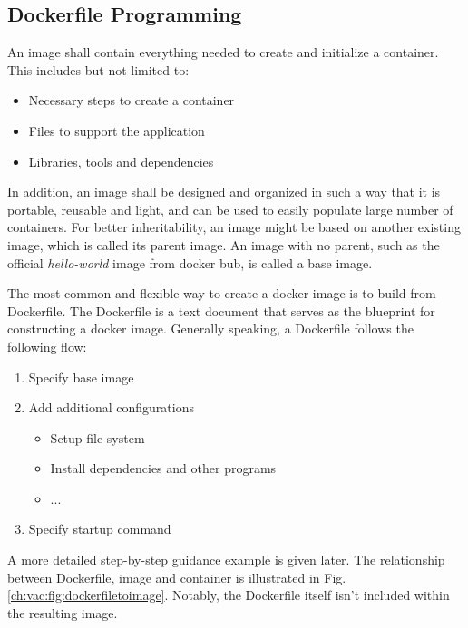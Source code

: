 \subsection{Dockerfile Programming}

An image shall contain everything needed to create and initialize a container. This includes but not limited to:
\begin{itemize}
  \item Necessary steps to create a container
  \item Files to support the application
  \item Libraries, tools and dependencies
\end{itemize}
In addition, an image shall be designed and organized in such a way that it is portable, reusable and light, and can be used to easily populate large number of containers. For better inheritability, an image might be based on another existing image, which is called its parent image. An image with no parent, such as the official \textit{hello-world} image from docker bub, is called a base image.

The most common and flexible way to create a docker image is to build from Dockerfile. The Dockerfile is a text document that serves as the blueprint for constructing a docker image. Generally speaking, a Dockerfile follows the following flow:
\begin{enumerate}[(1)]
	\item Specify base image
	\item Add additional configurations
	\begin{itemize}
		\item Setup file system
		\item Install dependencies and other programs
		\item ...
	\end{itemize}
	\item Specify startup command
\end{enumerate}
A more detailed step-by-step guidance example is given later. The relationship between Dockerfile, image and container is illustrated in Fig. \ref{ch:vac:fig:dockerfiletoimage}. Notably, the Dockerfile itself isn't included within the resulting image.

